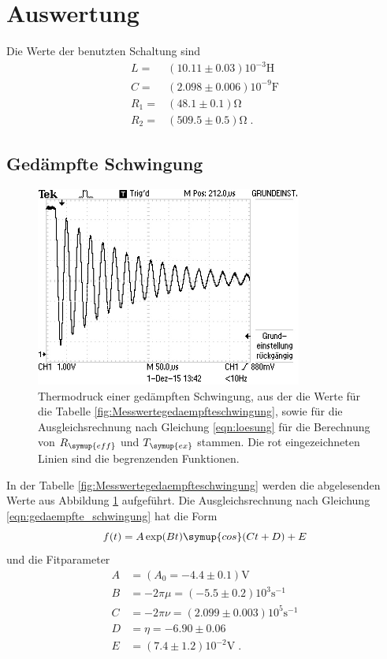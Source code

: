 \section{Auswertung}
\label{sec:Auswertung}
Die Werte der benutzten Schaltung sind
\begin{align*}
  L=&(10.11\pm0.03)10^{-3}\si{\henry}\\
  C=&(2.098\pm0.006)10^{-9}\si{\farad}\\
  R_1=&(48.1\pm0.1)\si{\ohm}\\
  R_2=&(509.5\pm0.5)\si{\ohm}\;.
\end{align*}
\subsection{Gedämpfte Schwingung}
\begin{figure}
  \centering
  \includegraphics[width=0.78\textwidth]{Thermodruck.JPG}
  \caption{Thermodruck einer gedämpften Schwingung, aus der die Werte für
  die Tabelle \ref{fig:Messwertegedaempfteschwingung}, sowie für die Ausgleichsrechnung
  nach Gleichung \eqref{eqn:loesung} für die Berechnung von $R_{\symup{eff}}$
  und $T_{\symup{ex}}$ stammen. Die rot eingezeichneten Linien sind die
  begrenzenden Funktionen.}
  \label{fig:termodruck}
\end{figure}
In der Tabelle \ref{fig:Messwertegedaempfteschwingung} werden die
abgelesenden Werte aus Abbildung \ref{fig:termodruck}
aufgeführt. Die Ausgleichsrechnung nach Gleichung
\eqref{eqn:gedaempfte_schwingung} hat die Form
\begin{equation*}
  f(t)=A\exp(Bt)\symup{cos}(Ct+D)+E
\end{equation*}
und die Fitparameter
\begin{align*}
  A&=(A_0=-4.4\pm0.1)\si{\volt}  \\
  B&=-2\pi\mu=(-5.5\pm0.2)10^3\si{\second^{-1}}  \\
  C&=-2\pi\nu=(2.099\pm0.003)10^5\si{\second^{-1}}   \\
  D&=\eta=-6.90\pm0.06  \\
  E&=(7.4\pm1.2)10^{-2}\si{\volt}\;.
\end{align*}
